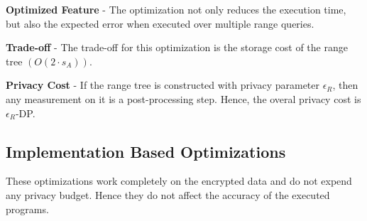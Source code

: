 


\squishlist
\item \textbf{Optimized Feature} - The optimization not only reduces the execution time, but also the expected error when executed over multiple range queries.
\item \textbf{Trade-off} - The trade-off for this optimization is the storage cost of the range tree $(O(2\cdot s_A))$.
\item \textbf{Privacy Cost} - If the range tree is constructed  with privacy parameter $\epsilon_R$, then any measurement on it is a post-processing step. Hence, the overal privacy cost is $\epsilon_R$-DP.
\squishend

\subsection{Implementation Based Optimizations} \label{sec:im_optimization}
These optimizations work completely on the encrypted data and do not expend any privacy budget. Hence they do not affect the accuracy of the executed programs.

